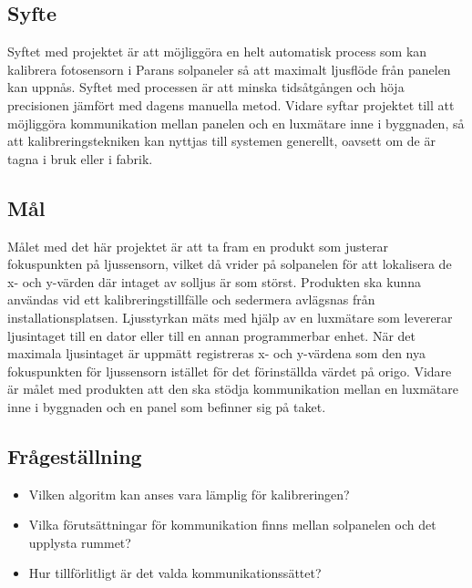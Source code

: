     \subsection{Syfte} %
    \label{sub:syfte}
          Syftet med projektet är att möjliggöra en helt automatisk process som kan kalibrera fotosensorn i Parans solpaneler så att maximalt ljusflöde från panelen kan uppnås. Syftet med processen är att minska tidsåtgången och höja precisionen jämfört med dagens manuella metod. 
          Vidare syftar projektet till att möjliggöra kommunikation mellan panelen och en luxmätare inne i byggnaden, så att kalibreringstekniken kan nyttjas till systemen generellt, oavsett om de är tagna i bruk eller i fabrik.

    \subsection{Mål} %
    \label{sub:mal}
        Målet med det här projektet är att ta fram en produkt som justerar fokuspunkten på ljussensorn, vilket då vrider på solpanelen för att lokalisera de x- och y-värden där intaget av solljus är som störst. Produkten ska kunna användas vid ett kalibreringstillfälle och sedermera avlägsnas från installationsplatsen.
        Ljusstyrkan mäts med hjälp av en luxmätare som levererar ljusintaget till en dator eller till en annan programmerbar enhet. 
        När det maximala ljusintaget är uppmätt registreras x- och y-värdena som den nya fokuspunkten för ljussensorn istället för det förinställda värdet på origo. 
        Vidare är målet med produkten att den ska stödja kommunikation mellan en luxmätare inne i byggnaden och en panel som befinner sig på taket. 


    \subsection{Frågeställning} %
    \label{sub:fragestallning}
        \begin{itemize}
            \item Vilken algoritm kan anses vara lämplig för kalibreringen?
            \item Vilka förutsättningar för kommunikation finns mellan solpanelen och \newline det upplysta rummet? 
            \item Hur tillförlitligt är det valda kommunikationssättet? 
            
        \end{itemize}

